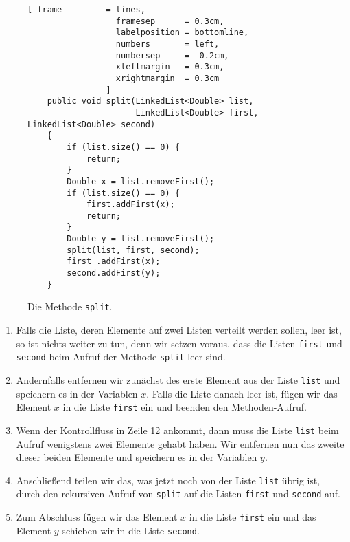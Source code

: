 \begin{figure}[!ht]
  \centering
\begin{Verbatim}[ frame         = lines, 
                  framesep      = 0.3cm, 
                  labelposition = bottomline,
                  numbers       = left,
                  numbersep     = -0.2cm,
                  xleftmargin   = 0.3cm,
                  xrightmargin  = 0.3cm
                ]
    public void split(LinkedList<Double> list, 
                      LinkedList<Double> first, LinkedList<Double> second) 
    {
        if (list.size() == 0) {
            return;
        }
        Double x = list.removeFirst();
        if (list.size() == 0) {
            first.addFirst(x);
            return;
        }
        Double y = list.removeFirst();
        split(list, first, second);
        first .addFirst(x);
        second.addFirst(y);
    }
\end{Verbatim}
\vspace*{-0.3cm}
  \caption{Die Methode \texttt{split}.}
  \label{fig:split}
\end{figure}
\begin{enumerate}
\item Falls die Liste, deren Elemente auf zwei Listen verteilt werden sollen, leer ist,
      so ist nichts weiter zu tun, denn wir setzen voraus, dass die Listen \texttt{first}
      und \texttt{second} beim Aufruf der Methode \texttt{split} leer sind.
\item Andernfalls entfernen wir zun\"achst des erste Element aus der Liste \texttt{list} und
      speichern es in der Variablen $x$.
      Falls die Liste danach leer ist, f\"ugen wir das Element $x$
      in die Liste \texttt{first} ein und beenden den Methoden-Aufruf.
\item Wenn der Kontrollfluss in Zeile 12 ankommt, dann muss die Liste \texttt{list} beim Aufruf
      wenigstens zwei Elemente gehabt haben.  Wir entfernen nun das zweite dieser beiden
      Elemente und speichern es in der Variablen $y$.
\item Anschlie{\ss}end teilen wir das, was jetzt noch von der Liste \texttt{list} \"ubrig ist,
      durch den rekursiven Aufruf von \texttt{split} auf die Listen \texttt{first} und
      \texttt{second} auf.
\item Zum Abschluss f\"ugen wir das Element $x$ in die Liste \texttt{first} ein
      und das Element $y$ schieben wir in die Liste \texttt{second}.
\end{enumerate}


